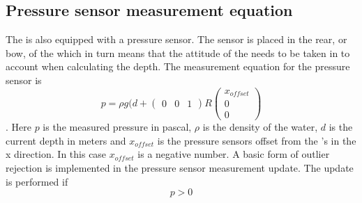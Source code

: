 \subsection{Pressure sensor measurement equation}
The \abbrROV is also equipped with a pressure sensor. The sensor is placed in the rear, or bow, of the \abbrROV which in turn means that the attitude of the \abbrROV needs to be taken in to account when calculating the depth.
The measurement equation for the pressure sensor is
\begin{equation}
p =  \rho g (d + \begin{pmatrix}
    0 & 0 & 1
\end{pmatrix} R 
\begin{pmatrix}
x_{offset}\\
0\\
0
\end{pmatrix}
\end{equation}.
Here $p$ is the measured pressure in pascal, $\rho$ is the density of the water, $d$ is the current depth in meters and $x_{offset}$ is the pressure sensors offset from the \abbrROV's \abbrCO in the x direction. In this case $x_{offset}$ is a negative number. A basic form of outlier rejection is implemented in the pressure sensor measurement update. The update is performed if
\begin{equation}
    p > 0
\end{equation}